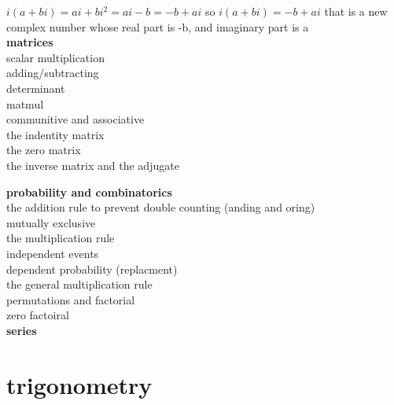 \documentclass{article}
\begin{document}
	$i(a + bi) = ai + bi^2 = ai - b = -b + ai$ so $i(a + bi) = -b + ai$ that is a new complex number whose real part is -b, and imaginary part is a\\

\textbf{matrices}\\
scalar multiplication\\
adding/subtracting\\
determinant\\
matmul\\
communitive and associative\\
the indentity matrix\\
the zero matrix\\
the inverse matrix and the adjugate

\textbf{probability and combinatorics}\\
the addition rule to prevent double counting (anding and oring)\\
mutually exclusive\\
the multiplication rule\\
independent events\\
dependent probability (replacment)\\
the general multiplication rule\\
permutations and factorial\\
zero factoiral\\

\textbf{series}\\





\section*{trigonometry}
\end{document}
